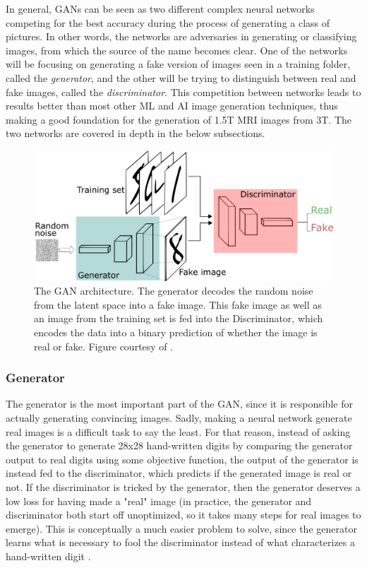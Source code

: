 \documentclass[12pt, fleqn, titlepage]{article}
\begin{document}
In general, GANs can be seen as two different complex neural networks competing for the best accuracy during  the process of generating a class of pictures. In other words, the networks are adversaries in generating or classifying images, from which the source of the name becomes clear. One of the networks will be focusing on generating a fake version of images seen in a training folder, called the \textit{generator}, and the other will be trying to distinguish between real and fake images, called the \textit{discriminator}. This competition between networks leads to results better than most other ML and AI image generation techniques, thus making a good foundation for the generation of 1.5T MRI images from 3T. The two networks are covered in depth in the below subsections.
\begin{figure}[H]
	\centering
	\includegraphics[width=0.7\linewidth]{"imgs/GAN architecture"}
	\caption{The GAN architecture. The generator decodes the random noise from the latent space into a fake image. This fake image as well as an image from the training set is fed into the Discriminator, which encodes the data into a binary prediction of whether the image is real or fake. Figure courtesy of \cite{gan_introduction_towards_datascience}.}
	\label{fig:gan-architecture}
\end{figure}


\subsubsection{Generator}
The generator is the most important part of the GAN, since it is responsible for actually generating convincing images. Sadly, making a neural network generate real images is a difficult task to say the least. For that reason, instead of asking the generator to generate 28x28 hand-written digits by comparing the generator output to real digits using some objective function, the output of the generator is instead fed to the discriminator, which predicts if the generated image is real or not. If the discriminator is tricked by the generator, then the generator deserves a low loss for having made a "real" image (in practice, the generator and discriminator both start off unoptimized, so it takes many steps for real images to emerge). This is conceptually a much easier problem to solve, since the generator learns what is necessary to fool the discriminator instead of what characterizes a hand-written digit \cite{developers.google_generator}.
\end{document}
